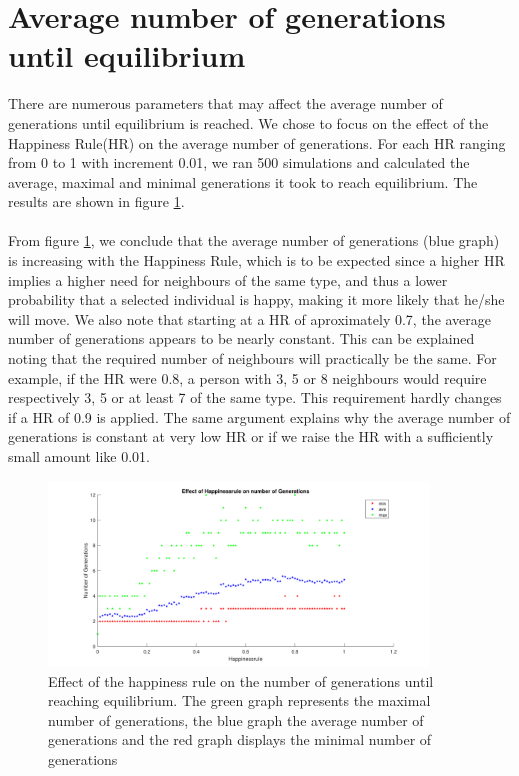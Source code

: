 
\section{Average number of generations until equilibrium}\label{sec:aantgen}
There are numerous parameters that may affect the average number of generations until  equilibrium is reached. We chose to focus on the effect of the Happiness Rule(HR) on the average number of generations. For each HR ranging from 0 to 1 with increment 0.01, we ran 500 simulations and calculated the average, maximal and minimal generations it took to reach equilibrium. The results are shown in figure \ref{fig:avegen}.\\
\\
From figure \ref{fig:avegen}, we conclude that the average number of generations (blue graph) is increasing with the Happiness Rule, which is to be expected since a higher HR implies a higher need for neighbours of the same type, and thus a lower probability that a selected individual is happy, making it more likely that he/she will move. We also note that starting at a HR of aproximately 0.7, the average number of generations appears to be nearly constant. This can be explained noting that the required number of neighbours will practically be the same. For example, if the HR were 0.8, a person with 3, 5 or 8 neighbours would require respectively 3, 5 or at least 7 of the same type. This requirement hardly changes if a HR of 0.9 is applied. The same argument explains why the average number of generations is constant at very low HR or if we raise the HR with a sufficiently small amount like 0.01.\\
\begin{figure}[h!]
    \centering
    \includegraphics[width=0.9\textwidth]{happinessregel_aantgen_2.pdf}
    \caption{Effect of the happiness rule on the number of generations until reaching equilibrium. The green graph represents the maximal number of generations, the blue graph the average number of generations and the red graph displays the minimal number of generations}
    \label{fig:avegen}
\end{figure}
